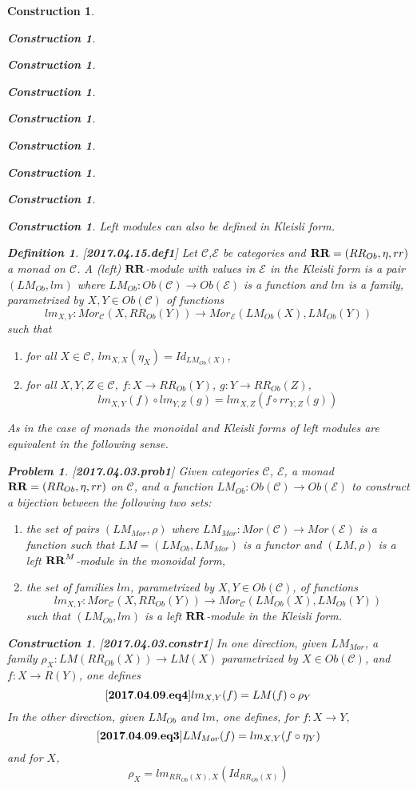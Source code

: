 \documentclass[12pt]{amsart}
\newenvironment{eq}{\begin{equation}}{\end{equation}}
\newtheorem{definition}[proposition]{Definition}
\newtheorem{problem}[proposition]{Problem}
\newtheorem{construction}[proposition]{Construction}
\newcommand{\llabel}[1]{\label{#1}[{\bf #1}]}
\newcommand{\sr}{\rightarrow}
\newcommand{\RR}{{\bf RR}}
\newcommand{\C}{{\mathcal C}}
\newcommand{\E}{{\mathcal E}}
\begin{document}
\begin{construction}
\begin{construction}
\begin{construction}
\begin{construction}
\begin{construction}
\begin{construction}
\begin{construction}
\begin{construction}
\begin{construction}
Left modules can also be defined in Kleisli form. 
%
\begin{definition}
\llabel{2017.04.15.def1}
Let $\C$,$\E$ be categories and $\RR=(RR_{Ob},\eta,rr)$ a monad on $\C$. A (left) $\RR$-module with values in $\E$ in the Kleisli form is a pair $(LM_{Ob},lm)$ where $LM_{Ob}:Ob(\C)\sr Ob(\E)$ is a function and $lm$ is a family, parametrized by $X,Y\in Ob(\C)$ of functions
%
$$lm_{X,Y}:Mor_{\C}(X,RR_{Ob}(Y))\sr Mor_{\E}(LM_{Ob}(X),LM_{Ob}(Y))$$
%
such that
%
\begin{enumerate}
\item for all $X\in\C$, $lm_{X,X}(\eta_X)=Id_{LM_{Ob}(X)}$,
\item for all $X,Y,Z\in\C$, $f:X\sr RR_{Ob}(Y)$, $g:Y\sr RR_{Ob}(Z)$, 
%
$$lm_{X,Y}(f)\circ lm_{Y,Z}(g)=lm_{X,Z}(f\circ rr_{Y,Z}(g))$$
\end{enumerate}
\end{definition}
%
As in the case of monads the monoidal and Kleisli forms of left modules are equivalent in the following sense.
%
\begin{problem}
\llabel{2017.04.03.prob1}
Given categories $\C$, $\E$, a monad $\RR=(RR_{Ob},\eta,rr)$ on $\C$, and a function $LM_{Ob}:Ob(\C)\sr Ob(\E)$ to construct a bijection between the following two sets:
%
\begin{enumerate}
\item the set of pairs $(LM_{Mor},\rho)$ where $LM_{Mor}:Mor(\C)\sr Mor(\E)$ is a function such that $LM=(LM_{Ob},LM_{Mor})$ is a functor and $(LM,\rho)$ is a left $\RR^M$-module in the monoidal form,
\item the set of families $lm$, parametrized by $X,Y\in Ob(\C)$, of functions
%
$$lm_{X,Y}:Mor_{\C}(X,RR_{Ob}(Y))\sr Mor_{\C}(LM_{Ob}(X),LM_{Ob}(Y))$$
%
such that $(LM_{Ob},lm)$ is a left $\RR$-module in the Kleisli form. 
\end{enumerate}
\end{problem}
%
\begin{construction}\rm\llabel{2017.04.03.constr1}
In one direction, given $LM_{Mor}$, a family $\rho_X:LM(RR_{Ob}(X))\sr LM(X)$ parametrized by $X\in Ob(\C)$, and $f:X\sr R(Y)$, one defines 
%
\begin{eq}\llabel{2017.04.09.eq4}
lm_{X,Y}(f)=LM(f)\circ \rho_Y
\end{eq}
%
In the other direction, given $LM_{Ob}$ and $lm$, one defines, for $f:X\sr Y$, 
%
\begin{eq}\llabel{2017.04.09.eq3}
LM_{Mor}(f)=lm_{X,Y}(f\circ \eta_Y)
\end{eq}
%
and for $X$, 
%
$$\rho_X=lm_{RR_{Ob}(X),X}(Id_{RR_{Ob}(X)})$$


\end{construction}
\end{construction}
\end{construction}
\end{construction}
\end{construction}
\end{construction}
\end{construction}
\end{construction}
\end{construction}
\end{construction}
\end{document}
